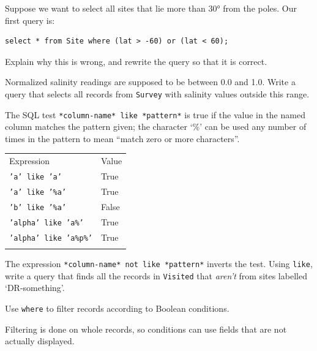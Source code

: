 \documentclass{book}
\begin{document}
\begin{swcenumerate}
\item
  Suppose we want to select all sites that lie more than 30° from the
  poles. Our first query is:

\begin{verbatim}
select * from Site where (lat > -60) or (lat < 60);
\end{verbatim}

  Explain why this is wrong, and rewrite the query so that it is
  correct.
\item
  Normalized salinity readings are supposed to be between 0.0 and 1.0.
  Write a query that selects all records from \texttt{Survey} with
  salinity values outside this range.
\item
  The SQL test \texttt{*column-name* like *pattern*} is true if the
  value in the named column matches the pattern given; the character
  `\%' can be used any number of times in the pattern to mean ``match
  zero or more characters''.

  \begin{tabular}{@{}ll@{}}
  \hline\noalign{\medskip}
  Expression & Value
  \\\noalign{\medskip}
  \hline\noalign{\medskip}
  \texttt{'a' like 'a'} & True
  \\\noalign{\medskip}
  \texttt{'a' like '\%a'} & True
  \\\noalign{\medskip}
  \texttt{'b' like '\%a'} & False
  \\\noalign{\medskip}
  \texttt{'alpha' like 'a\%'} & True
  \\\noalign{\medskip}
  \texttt{'alpha' like 'a\%p\%'} & True
  \\\noalign{\medskip}
  \hline
  \end{tabular}

  The expression \texttt{*column-name* not like *pattern*} inverts the
  test. Using \texttt{like}, write a query that finds all the records in
  \texttt{Visited} that \emph{aren't} from sites labelled
  `DR-something'.
\end{swcenumerate}

\begin{keypoints}
\begin{swcitemize}
\item
  Use \texttt{where} to filter records according to Boolean conditions.
\item
  Filtering is done on whole records, so conditions can use fields that
  are not actually displayed.
\end{swcitemize}
\end{keypoints}
\end{document}
